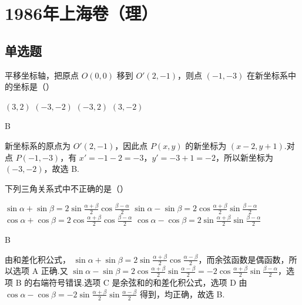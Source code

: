 \chapter{1986年上海卷（理）}

\section{单选题}

\begin{problem}

平移坐标轴，把原点 \(O(0,0)\) 移到 \(O'(2,-1)\)，则点 \((-1,-3)\) 在新坐标系中的坐标是（\quad）

\choices
    {\(\left( 3,2 \right)\)}
    {\(\left( -3,-2 \right)\)}
    {\(\left( -3,2 \right)\)}
    {\(\left( 3,-2 \right)\)}
\end{problem}

\begin{answer}
B
\end{answer}

\begin{solution}
新坐标系的原点为 \(O'(2,-1)\)，因此点 \(P(x,y)\) 的新坐标为
\(\left(x-2,y+1\right)\).对点 \(P(-1,-3)\)，有
\(x'=-1-2=-3\)，\(y'=-3+1=-2\)，所以新坐标为
\(\left(-3,-2\right)\)，故选 B.
\end{solution}

\begin{problem}

下列三角关系式中不正确的是（\quad）

\choices
    {\(\sin\alpha+\sin\beta=2\sin \frac{\alpha+\beta}{2}\cos \frac{\beta-\alpha}{2}\)}
    {\(\sin\alpha-\sin\beta=2\cos \frac{\alpha+\beta}{2}\sin \frac{\beta-\alpha}{2}\)}
    {\(\cos\alpha+\cos\beta=2\cos \frac{\alpha+\beta}{2}\cos \frac{\beta-\alpha}{2}\)}
    {\(\cos\alpha-\cos\beta=2\sin \frac{\alpha+\beta}{2}\sin \frac{\beta-\alpha}{2}\)}
\end{problem}

\begin{answer}
B
\end{answer}

\begin{solution}
由和差化积公式，
\(\sin\alpha+\sin\beta=2\sin\frac{\alpha+\beta}{2}\cos\frac{\alpha-\beta}{2}\)，而余弦函数是偶函数，所以选项 A 正确.又
\(\sin\alpha-\sin\beta=2\cos\frac{\alpha+\beta}{2}\sin\frac{\alpha-\beta}{2}=-2\cos\frac{\alpha+\beta}{2}\sin\frac{\beta-\alpha}{2}\)，选项 B 的右端符号错误.选项 C 是余弦和的和差化积公式，选项 D 由
\(\cos\alpha-\cos\beta=-2\sin\frac{\alpha+\beta}{2}\sin\frac{\alpha-\beta}{2}\) 得到，均正确，故选 B.
\end{solution}

